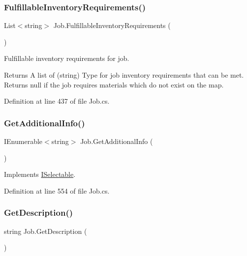 \subsubsection{\texorpdfstring{Fulfillable\+Inventory\+Requirements()}{FulfillableInventoryRequirements()}}
{\footnotesize\ttfamily List$<$string$>$ Job.\+Fulfillable\+Inventory\+Requirements (\begin{DoxyParamCaption}{ }\end{DoxyParamCaption})}



Fulfillable inventory requirements for job. 

\begin{DoxyReturn}{Returns}
A list of (string) Type for job inventory requirements that can be met. Returns null if the job requires materials which do not exist on the map.
\end{DoxyReturn}


Definition at line 437 of file Job.\+cs.

\mbox{\label{class_job_a12f5c3ebc9277bc67f110ec80287ae37}} 
\subsubsection{\texorpdfstring{Get\+Additional\+Info()}{GetAdditionalInfo()}}
{\footnotesize\ttfamily I\+Enumerable$<$string$>$ Job.\+Get\+Additional\+Info (\begin{DoxyParamCaption}{ }\end{DoxyParamCaption})}



Implements \hyperlink{interface_i_selectable_a337f81bfa99bb254bb2f7de6a8b5cd4b}{I\+Selectable}.



Definition at line 554 of file Job.\+cs.

\mbox{\label{class_job_a03ba4d976ec78d3e36b6ac7f5124ca06}} 
\subsubsection{\texorpdfstring{Get\+Description()}{GetDescription()}}
{\footnotesize\ttfamily string Job.\+Get\+Description (\begin{DoxyParamCaption}{ }\end{DoxyParamCaption})}



